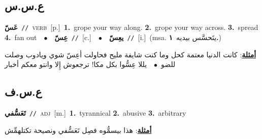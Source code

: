 \documentclass[10pt,a4paper,twoside]{article} %
\begin{document}
\begin{multicols}{2}
\vspace{-3mm}
\subsection*{\color{blue}\foreignlanguage{arabic}{ع.س.س}\color{blue}{}} 

{\setlength\topsep{0pt}\textbf{\foreignlanguage{arabic}{عَسّ}}\ {\color{gray}\texttt{//}\color{black}}\ \textsc{verb}\ [p.]\ \textbf{1.}~grope your way along.  \textbf{2.}~grope your way across.  \textbf{3.}~spread  \textbf{4.}~fan out\ \ $\bullet$\ \ \setlength\topsep{0pt}\textbf{\foreignlanguage{arabic}{عِسّ}}\ {\color{gray}\texttt{//}\color{black}}\ [c.]\ \ $\bullet$\ \ \setlength\topsep{0pt}\textbf{\foreignlanguage{arabic}{يعِسّ}}\ {\color{gray}\texttt{//}\color{black}}\ [i.]\ \color{gray}(msa. \foreignlanguage{arabic}{يتَحسَّس بيديه}~\foreignlanguage{arabic}{\textbf{١.}})\color{black}\  \begin{flushright}\color{gray}\foreignlanguage{arabic}{\textbf{\underline{\foreignlanguage{arabic}{أمثلة}}}: كانت الدنيا معتمة كحل وما كنت شايفة مليح فحاولت أعِسّ شوي ويادوب وصلت للضو\ $\bullet$\ \  يللا عِسُّوا بكل مكا! ترجعوش إِلا وانتو معكم أخبار}\end{flushright}\color{black}} \vspace{2mm}

\vspace{-3mm}
\subsection*{\color{blue}\foreignlanguage{arabic}{ع.س.ف}\color{blue}{}} 

{\setlength\topsep{0pt}\textbf{\foreignlanguage{arabic}{تَعَسُّفي}}\ {\color{gray}\texttt{//}\color{black}}\ \textsc{adj}\ [m.]\ \textbf{1.}~tyrannical  \textbf{2.}~abusive  \textbf{3.}~arbitrary\  \begin{flushright}\color{gray}\foreignlanguage{arabic}{\textbf{\underline{\foreignlanguage{arabic}{أمثلة}}}: هذا بيسمُّوه فصِل تَعَسُّفي ونصيحة تكتلهمِّش}\end{flushright}\color{black}} \vspace{2mm}


\end{multicols}
\end{document}
